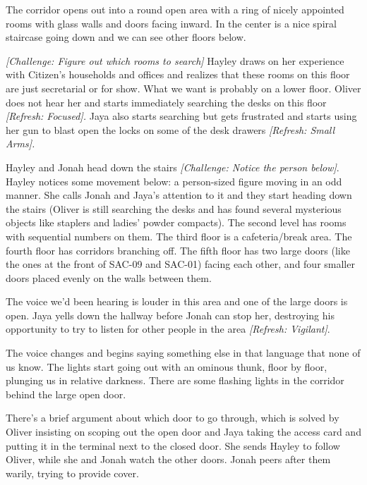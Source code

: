 The corridor opens out into a round open area with a ring of nicely appointed rooms with glass walls and doors facing inward.  In the center is a nice spiral staircase going down and we can see other floors below. 



\textit{{[}Challenge: Figure out which rooms to search{]} } Hayley draws on her experience with Citizen's households and offices and realizes that these rooms on this floor are just secretarial or for show.  What we want is probably on a lower floor.  Oliver does not hear her and starts immediately searching the desks on this floor \textit{{[}Refresh: Focused{]}.}  Jaya also starts searching but gets frustrated and starts using her gun to blast open the locks on some of the desk drawers \textit{{[}Refresh: Small Arms{]}.} 



Hayley and Jonah head down the stairs \textit{{[}Challenge: Notice the person below{]}}. Hayley notices some movement below: a person-sized figure moving in an odd manner.  She calls Jonah and Jaya's attention to it and they start heading down the stairs (Oliver is still searching the desks and has found several mysterious objects like staplers and ladies' powder compacts).  The second level has rooms with sequential numbers on them.  The third floor is a cafeteria/break area.  The fourth floor has corridors branching off.  The fifth floor has two large doors (like the ones at the front of SAC-09 and SAC-01) facing each other, and four smaller doors placed evenly on the walls between them.  



The voice we'd been hearing is louder in this area and one of the large doors is open.  Jaya yells down the hallway before Jonah can stop her, destroying his opportunity to try to listen for other people in the area \textit{{[}Refresh: Vigilant{]}}.  



The voice changes and begins saying something else in that language that none of us know.  The lights start going out with an ominous thunk, floor by floor, plunging us in relative darkness.  There are some flashing lights in the corridor behind the large open door.



There's a brief argument about which door to go through, which is solved by Oliver insisting on scoping out the open door and Jaya taking the access card and putting it in the terminal next to the closed door.  She sends Hayley to follow Oliver, while she and Jonah watch the other doors.  Jonah peers after them warily, trying to provide cover.



